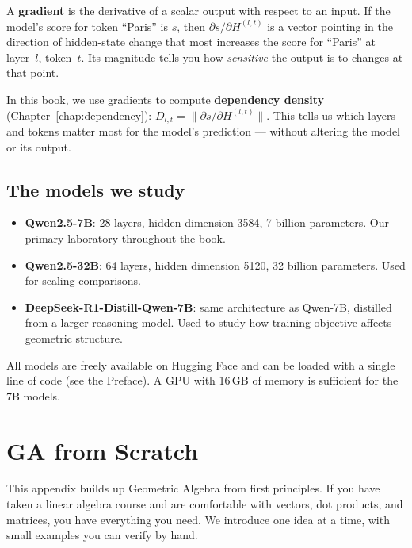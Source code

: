 \documentclass[11pt, twoside, openright]{memoir}
\begin{document}
A \textbf{gradient} is the derivative of a scalar output with respect
to an input.  If the model's score for token ``Paris'' is
$s$, then $\partial s / \partial H^{(l,t)}$ is a vector pointing in
the direction of hidden-state change that most increases the score for
``Paris'' at layer~$l$, token~$t$.  Its magnitude tells you how
\emph{sensitive} the output is to changes at that point.

In this book, we use gradients to compute \textbf{dependency density}
(Chapter~\ref{chap:dependency}): $D_{l,t} = \|\partial s / \partial
H^{(l,t)}\|$.  This tells us which layers and tokens matter most for
the model's prediction --- without altering the model or its output.

\section{The models we study}

\begin{itemize}[nosep]
\item \textbf{Qwen2.5-7B}: 28 layers, hidden dimension 3584, 7 billion
  parameters.  Our primary laboratory throughout the book.
\item \textbf{Qwen2.5-32B}: 64 layers, hidden dimension 5120, 32
  billion parameters.  Used for scaling comparisons.
\item \textbf{DeepSeek-R1-Distill-Qwen-7B}: same architecture as
  Qwen-7B, distilled from a larger reasoning model.  Used to study
  how training objective affects geometric structure.
\end{itemize}

All models are freely available on Hugging Face and can be loaded with
a single line of code (see the Preface).  A GPU with 16\,GB of memory
is sufficient for the 7B models.


\chapter{GA from Scratch}
\label{app:ga-formal}

This appendix builds up Geometric Algebra from first principles.
If you have taken a linear algebra course and are comfortable with
vectors, dot products, and matrices, you have everything you need.
We introduce one idea at a time, with small examples you can verify
by hand.
\end{document}
